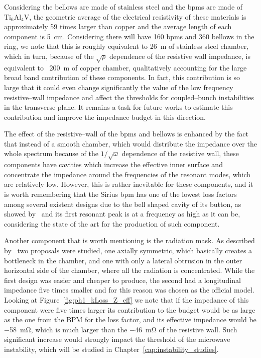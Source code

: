     Considering the bellows are made of stainless steel and the \glspl{bpm} are made of $\text{Ti}_\text{6}\text{Al}_\text{4}\text{V}$, the geometric average of the electrical resistivity of these materials is approximately \num{59} times larger than copper and the average length of each component is \SI{5}{\centi\meter}. Considering there will have \num{160} \glspl{bpm} and \num{360} bellows in the ring, we note that this is roughly equivalent to \SI{26}{\meter} of stainless steel chamber, which in turn, because of the $\sqrt{\rho}$ dependence of the resistive wall impedance, is equivalent to ~\SI{200}{\meter} of copper chamber, qualitatively accounting for the large broad band contribution of these components. In fact, this contribution is so large that it could even change significantly the value of the low frequency resistive--wall impedance and affect the thresholds for coupled--bunch instabilities in the transverse plane. It remains a task for future works to estimate this contribution and improve the impedance budget in this direction.

    The effect of the resistive--wall of the \glspl{bpm} and bellows is enhanced by the fact that instead of a smooth chamber, which would distribute the impedance over the whole spectrum because of the $1/\sqrt{\omega}$ dependence of the resistive wall, these components have cavities which increase the effective inner surface and concentrate the impedance around the frequencies of the resonant modes, which are relatively low. However, this is rather inevitable for these components, and it is worth remembering that the Sirius \gls{bpm} has one of the lowest loss factors among several existent designs due to the bell shaped cavity of its button, as showed by~ and its first resonant peak is at a frequency as high as it can be, considering the state of the art for the production of such component.

    Another component that is worth mentioning is the radiation mask. As described by~ two proposals were studied, one axially symmetric, which basically creates a bottleneck in the chamber, and one with only a lateral obtrusion in the outer horizontal side of the chamber, where all the radiation is concentrated. While the first design was easier and cheaper to produce, the second had a longitudinal impedance five times smaller and for this reason was chosen as the official model. Looking at Figure~\ref{fig:ph1_kLoss_Z_eff} we note that if the impedance of this component were five times larger its contribution to the budget would be as large as the one from the BPM for the loss factor, and its effective impedance would be \SI{-58}{\milli\ohm}, which is much larger than the \SI{-46}{\milli\ohm} of the resistive wall. Such significant increase would strongly impact the threshold of the microwave instability, which will be studied in Chapter~\ref{cap:instability_studies}.

